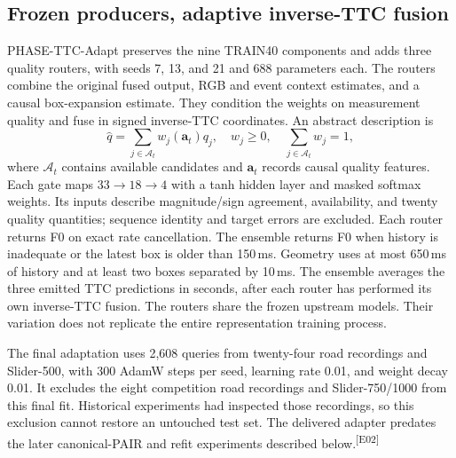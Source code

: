 \documentclass[twocolumn,letterpaper]{article}
\newcommand{\evid}[1]{\textsuperscript{\textsf{[#1]}}}
\begin{document}
\subsection{Frozen producers, adaptive inverse-TTC fusion}
PHASE-TTC-Adapt preserves the nine TRAIN40 components and adds three quality routers, with seeds 7, 13, and 21 and 688 parameters each. The routers combine the original fused output, RGB and event context estimates, and a causal box-expansion estimate. They condition the weights on measurement quality and fuse in signed inverse-TTC coordinates. An abstract description is
\begin{equation}
 \widehat q=\sum_{j\in\mathcal A_t}w_j(\mathbf a_t)q_j,
 \quad w_j\geq0,\quad \sum_{j\in\mathcal A_t}w_j=1,
\label{eq:router}
\end{equation}
where $\mathcal A_t$ contains available candidates and $\mathbf a_t$ records causal quality features. Each gate maps $33\!\rightarrow\!18\!\rightarrow\!4$ with a tanh hidden layer and masked softmax weights. Its inputs describe magnitude/sign agreement, availability, and twenty quality quantities; sequence identity and target errors are excluded. Each router returns F0 on exact rate cancellation. The ensemble returns F0 when history is inadequate or the latest box is older than 150\,ms. Geometry uses at most 650\,ms of history and at least two boxes separated by 10\,ms. The ensemble averages the three emitted TTC predictions in seconds, after each router has performed its own inverse-TTC fusion. The routers share the frozen upstream models. Their variation does not replicate the entire representation training process.

The final adaptation uses 2,608 queries from twenty-four road recordings and Slider-500, with 300 AdamW steps per seed, learning rate 0.01, and weight decay 0.01. It excludes the eight competition road recordings and Slider-750/1000 from this final fit. Historical experiments had inspected those recordings, so this exclusion cannot restore an untouched test set. The delivered adapter predates the later canonical-PAIR and refit experiments described below.\evid{E02}
\end{document}

